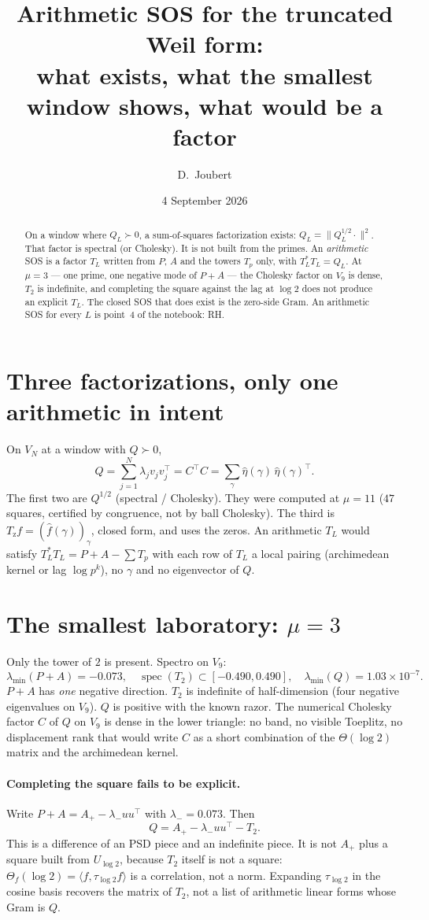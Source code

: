 \documentclass[11pt]{article}
\title{Arithmetic SOS for the truncated Weil form:\\
\large what exists, what the smallest window shows, what would be a factor}
\author{D.\ Joubert}
\date{4 September 2026}
\theoremstyle{remark}\newtheorem*{remark}{Remark}
\begin{document}
\maketitle
\begin{abstract}
\noindent
On a window where $Q_L\succ0$, a sum-of-squares factorization exists:
$Q_L=\|Q_L^{1/2}\cdot\|^2$. That factor is spectral (or Cholesky). It is
not built from the primes. An \emph{arithmetic} SOS is a factor
$T_L$ written from $P$, $A$ and the towers $T_p$ only, with
$T_L^*T_L=Q_L$. At $\mu=3$ --- one prime, one negative mode of
$P+A$ --- the Cholesky factor on $V_9$ is dense, $T_2$ is indefinite,
and completing the square against the lag at $\log2$ does not produce
an explicit $T_L$. The closed SOS that does exist is the zero-side
Gram. An arithmetic SOS for every $L$ is point~4 of the notebook: RH.
\end{abstract}

\section{Three factorizations, only one arithmetic in intent}
On $V_N$ at a window with $Q\succ0$,
\[
Q=\sum_{j=1}^{N}\lambda_j v_jv_j^{\!\top}
=C^{\!\top}C
=\sum_{\gamma}\hat\eta(\gamma)\,\hat\eta(\gamma)^{\!\top}.
\]
The first two are $Q^{1/2}$ (spectral / Cholesky). They were computed
at $\mu=11$ ($47$ squares, certified by congruence, not by ball
Cholesky). The third is $T_{\mathrm{z}}f=(\hat f(\gamma))_{\gamma}$,
closed form, and uses the zeros. An arithmetic $T_L$ would satisfy
$T_L^*T_L=P+A-\sum T_p$ with each row of $T_L$ a local pairing
(archimedean kernel or lag $\log p^k$), no $\gamma$ and no
eigenvector of $Q$.

\section{The smallest laboratory: $\mu=3$}
Only the tower of $2$ is present. Spectro on $V_9$:
\[
\lambda_{\min}(P+A)=-0.073,\quad
\operatorname{spec}(T_2)\subset[-0.490,0.490],
\quad
\lambda_{\min}(Q)=1.03\times10^{-7}.
\]
$P+A$ has \emph{one} negative direction. $T_2$ is indefinite of
half-dimension (four negative eigenvalues on $V_9$). $Q$ is positive
with the known razor. The numerical Cholesky factor $C$ of $Q$ on
$V_9$ is dense in the lower triangle: no band, no visible Toeplitz,
no displacement rank that would write $C$ as a short combination of
the $\Theta(\log2)$ matrix and the archimedean kernel.

\paragraph{Completing the square fails to be explicit.}
Write $P+A=A_+-\lambda_-uu^{\!\top}$ with $\lambda_-=0.073$. Then
\[
Q=A_+-\lambda_-uu^{\!\top}-T_2.
\]
This is a difference of an PSD piece and an indefinite piece. It is
not $A_+$ plus a square built from $U_{\log2}$, because $T_2$ itself
is not a square: $\Theta_f(\log2)=\langle f,\tau_{\log2}f\rangle$ is a
correlation, not a norm. Expanding $\tau_{\log2}$ in the cosine basis
recovers the matrix of $T_2$, not a list of arithmetic linear forms
whose Gram is $Q$.
\end{document}
